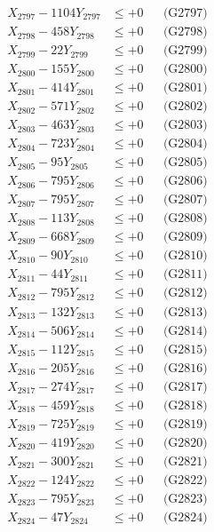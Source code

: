 \documentclass[a4paper,10pt]{article}
\begin{document}
{\begin{align}
X_{2797} - 1104Y_{2797} &\leq +0 && \text{(G2797)} \\
X_{2798} - 458Y_{2798} &\leq +0 && \text{(G2798)} \\
X_{2799} - 22Y_{2799} &\leq +0 && \text{(G2799)} \\
X_{2800} - 155Y_{2800} &\leq +0 && \text{(G2800)} \\
\allowbreak
X_{2801} - 414Y_{2801} &\leq +0 && \text{(G2801)} \\
X_{2802} - 571Y_{2802} &\leq +0 && \text{(G2802)} \\
X_{2803} - 463Y_{2803} &\leq +0 && \text{(G2803)} \\
X_{2804} - 723Y_{2804} &\leq +0 && \text{(G2804)} \\
X_{2805} - 95Y_{2805} &\leq +0 && \text{(G2805)} \\
X_{2806} - 795Y_{2806} &\leq +0 && \text{(G2806)} \\
X_{2807} - 795Y_{2807} &\leq +0 && \text{(G2807)} \\
X_{2808} - 113Y_{2808} &\leq +0 && \text{(G2808)} \\
X_{2809} - 668Y_{2809} &\leq +0 && \text{(G2809)} \\
X_{2810} - 90Y_{2810} &\leq +0 && \text{(G2810)} \\
\allowbreak
X_{2811} - 44Y_{2811} &\leq +0 && \text{(G2811)} \\
X_{2812} - 795Y_{2812} &\leq +0 && \text{(G2812)} \\
X_{2813} - 132Y_{2813} &\leq +0 && \text{(G2813)} \\
X_{2814} - 506Y_{2814} &\leq +0 && \text{(G2814)} \\
X_{2815} - 112Y_{2815} &\leq +0 && \text{(G2815)} \\
X_{2816} - 205Y_{2816} &\leq +0 && \text{(G2816)} \\
X_{2817} - 274Y_{2817} &\leq +0 && \text{(G2817)} \\
X_{2818} - 459Y_{2818} &\leq +0 && \text{(G2818)} \\
X_{2819} - 725Y_{2819} &\leq +0 && \text{(G2819)} \\
X_{2820} - 419Y_{2820} &\leq +0 && \text{(G2820)} \\
\allowbreak
X_{2821} - 300Y_{2821} &\leq +0 && \text{(G2821)} \\
X_{2822} - 124Y_{2822} &\leq +0 && \text{(G2822)} \\
X_{2823} - 795Y_{2823} &\leq +0 && \text{(G2823)} \\
X_{2824} - 47Y_{2824} &\leq +0 && \text{(G2824)} \\

\end{align}}
\end{document}
